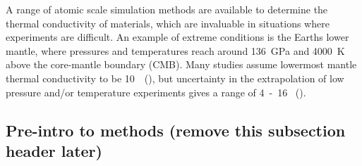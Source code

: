 \documentclass[%
preprint,                                  %
nofootinbib,
 amsmath,amssymb,
 aps,
]{revtex4-1}
\begin{document}
A range of atomic scale simulation methods are available to determine the thermal conductivity of materials, which are invaluable in situations where experiments are difficult. An example of extreme conditions is the Earth\textsc{}s lower mantle, where pressures and temperatures reach around 136~GPa and 4000~K above the core-mantle boundary (CMB). Many studies assume lowermost mantle thermal conductivity to be 10~\wmk~(\citet{Lay2008}), but uncertainty in the extrapolation of low pressure and/or temperature experiments gives a range of 4~-~16 \wmk~(\citet{Brown1986, Osako1991, Hofmeister1999, Goncharov2009, Manthilake2011, Ohta2012}).

 




\subsection{\label{sec:intro.pre}Pre-intro to methods (remove this subsection header later)}
\end{document}
